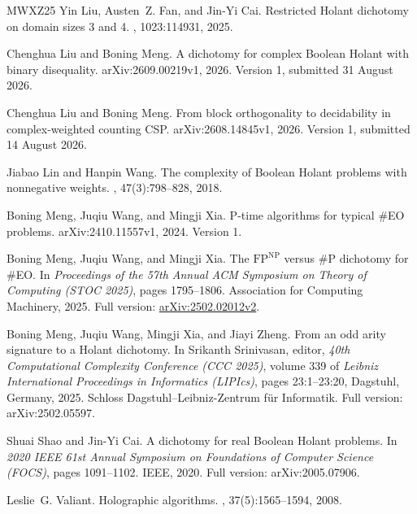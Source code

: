 \documentclass[11pt,letterpaper,onecolumn]{article}
\theoremstyle{plain}
\theoremstyle{definition}
\theoremstyle{remark}
\begin{document}
\begin{thebibliography}{MWXZ25}
Yin Liu, Austen~Z. Fan, and Jin-Yi Cai.
\newblock Restricted {Holant} dichotomy on domain sizes 3 and 4.
, 1023:114931, 2025.

Chenghua Liu and Boning Meng.
\newblock A dichotomy for complex {Boolean} {Holant} with binary disequality.
\newblock arXiv:2609.00219v1, 2026.
\newblock Version 1, submitted 31 August 2026.

Chenghua Liu and Boning Meng.
\newblock From block orthogonality to decidability in complex-weighted counting
  {CSP}.
\newblock arXiv:2608.14845v1, 2026.
\newblock Version 1, submitted 14 August 2026.

Jiabao Lin and Hanpin Wang.
\newblock The complexity of {Boolean} {Holant} problems with nonnegative
  weights.
, 47(3):798--828, 2018.

Boning Meng, Juqiu Wang, and Mingji Xia.
\newblock P-time algorithms for typical {{\#EO}} problems.
\newblock arXiv:2410.11557v1, 2024.
\newblock Version 1.

Boning Meng, Juqiu Wang, and Mingji Xia.
\newblock The {$\mathrm{FP}^{\mathrm{NP}}$} versus {{\#P}} dichotomy for
  {{\#EO}}.
\newblock In {\em Proceedings of the 57th Annual ACM Symposium on Theory of
  Computing (STOC 2025)}, pages 1795--1806. Association for Computing
  Machinery, 2025.
\newblock Full version:
  \href{https://arxiv.org/abs/2502.02012v2}{arXiv:2502.02012v2}.

Boning Meng, Juqiu Wang, Mingji Xia, and Jiayi Zheng.
\newblock From an odd arity signature to a {Holant} dichotomy.
\newblock In Srikanth Srinivasan, editor, {\em 40th Computational Complexity
  Conference (CCC 2025)}, volume 339 of {\em Leibniz International Proceedings
  in Informatics (LIPIcs)}, pages 23:1--23:20, Dagstuhl, Germany, 2025. Schloss
  Dagstuhl--Leibniz-Zentrum f{\"u}r Informatik.
\newblock Full version: arXiv:2502.05597.

Shuai Shao and Jin-Yi Cai.
\newblock A dichotomy for real {Boolean} {Holant} problems.
\newblock In {\em 2020 IEEE 61st Annual Symposium on Foundations of Computer
  Science (FOCS)}, pages 1091--1102. IEEE, 2020.
\newblock Full version: arXiv:2005.07906.

Leslie~G. Valiant.
\newblock Holographic algorithms.
, 37(5):1565--1594, 2008.


\end{thebibliography}
\end{document}
